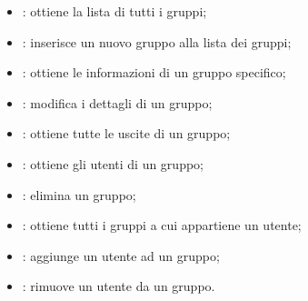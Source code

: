 \begin{itemize}
    \item {}: ottiene la lista di tutti i gruppi;
    \item {}: inserisce un nuovo gruppo alla lista dei gruppi;
    \item {}: ottiene le informazioni di un gruppo specifico;
    \item {}: modifica i dettagli di un gruppo;
    \item {}: ottiene tutte le uscite di un gruppo; 
    \item {}: ottiene gli utenti di un gruppo;
    \item {}: elimina un gruppo;
    \item {}: ottiene tutti i gruppi a cui appartiene un utente; 
    \item {}: aggiunge un utente ad un gruppo;  
    \item {}: rimuove un utente da un gruppo.
\end{itemize}
